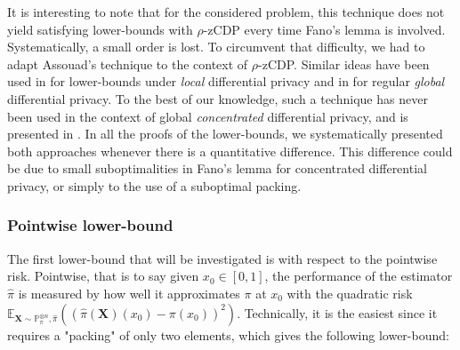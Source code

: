 \documentclass[10pt]{article} %
\newcommand{\Prob}[0]{\mathbb{P}}
\newcommand{\E}[0]{\mathbb{E}}
\newcommand\vect[1]{\mathbf{#1}}
\newcommand\p[1]{\left( {#1}\right)}
\begin{document}
It is interesting to note that for the considered problem, this technique does not yield satisfying lower-bounds with $\rho$-zCDP every time Fano's lemma is involved. Systematically, a small order is lost. To circumvent that difficulty, we had to adapt Assouad's technique to the context of $\rho$-zCDP. Similar ideas have been used in \citet{duchi2018minimax} for lower-bounds under \emph{local} differential privacy and in \citet{acharya2021differentially} for regular \emph{global} differential privacy. To the best of our knowledge, such a technique has never been used in the context of global \emph{concentrated} differential privacy, and is presented in . In all the proofs of the lower-bounds, we systematically presented both approaches whenever there is a quantitative difference. This difference could be due to small suboptimalities in Fano's lemma for concentrated differential privacy, or simply to the use of a suboptimal packing.


\subsubsection{Pointwise lower-bound}

The first lower-bound that will be investigated is with respect to the pointwise risk. Pointwise, that is to say given
$x_0 \in [0, 1]$, the performance of the estimator $\hat{\pi}$ is measured by how well it approximates $\pi$ at $x_{0}$ with the quadratic risk $\E_{\vect{X} \sim \Prob_{\pi}^{\otimes n}, \hat{\pi}}\p{\p{\hat{\pi}(\vect{X})(x_0) - \pi(x_0)}^2}$.
%
Technically, it is the easiest since it requires a "packing" of only two elements, which gives the following lower-bound:
\end{document}
